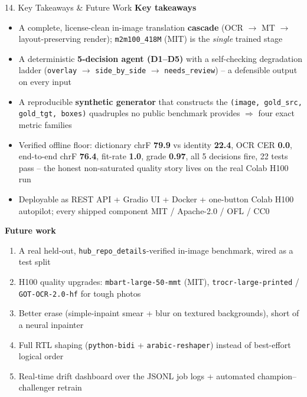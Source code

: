 \documentclass[10pt,aspectratio=169]{beamer}
\begin{document}
\begin{frame}{14. Key Takeaways \& Future Work}
\textbf{Key takeaways}
\begin{itemize}\small
  \item A complete, license-clean in-image translation \textbf{cascade} (OCR $\rightarrow$ MT $\rightarrow$ layout-preserving render); \texttt{m2m100\_418M} (MIT) is the \emph{single} trained stage
  \item A deterministic \textbf{5-decision agent (D1--D5)} with a self-checking degradation ladder (\texttt{overlay} $\rightarrow$ \texttt{side\_by\_side} $\rightarrow$ \texttt{needs\_review}) -- a defensible output on every input
  \item A reproducible \textbf{synthetic generator} that constructs the \texttt{(image, gold\_src, gold\_tgt, boxes)} quadruples no public benchmark provides $\Rightarrow$ four exact metric families
  \item Verified offline floor: dictionary chrF \textbf{79.9} vs identity \textbf{22.4}, OCR CER \textbf{0.0}, end-to-end chrF \textbf{76.4}, fit-rate \textbf{1.0}, grade \textbf{0.97}, all 5 decisions fire, 22 tests pass -- the honest non-saturated quality story lives on the real Colab H100 run
  \item Deployable as REST API + Gradio UI + Docker + one-button Colab H100 autopilot; every shipped component MIT / Apache-2.0 / OFL / CC0
\end{itemize}

\textbf{Future work}
\begin{enumerate}\small
  \item A real held-out, \texttt{hub\_repo\_details}-verified in-image benchmark, wired as a test split
  \item H100 quality upgrades: \texttt{mbart-large-50-mmt} (MIT), \texttt{trocr-large-printed} / \texttt{GOT-OCR-2.0-hf} for tough photos
  \item Better erase (simple-inpaint smear + blur on textured backgrounds), short of a neural inpainter
  \item Full RTL shaping (\texttt{python-bidi} + \texttt{arabic-reshaper}) instead of best-effort logical order
  \item Real-time drift dashboard over the JSONL job logs + automated champion--challenger retrain
\end{enumerate}
\end{frame}
\end{document}
